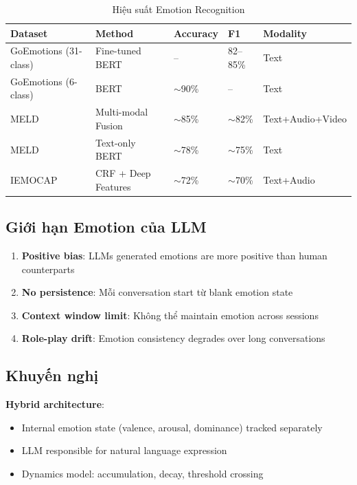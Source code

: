 \documentclass[10pt,leqno]{amsart}
\begin{document}
\begin{table}[H]
\centering
\caption{Hiệu suất Emotion Recognition}
\label{tab:emotion-bench}
\begin{tabular}{lllll}
\toprule
\textbf{Dataset} & \textbf{Method} & \textbf{Accuracy} & \textbf{F1} & \textbf{Modality} \\
\midrule
GoEmotions (31-class) & Fine-tuned BERT & -- & 82--85\% & Text \\
GoEmotions (6-class) & BERT & $\sim$90\% & -- & Text \\
MELD & Multi-modal Fusion & $\sim$85\% & $\sim$82\% & Text+Audio+Video \\
MELD & Text-only BERT & $\sim$78\% & $\sim$75\% & Text \\
IEMOCAP & CRF + Deep Features & $\sim$72\% & $\sim$70\% & Text+Audio \\
\bottomrule
\end{tabular}
\end{table}

\subsection{Giới hạn Emotion của LLM}

\begin{enumerate}
    \item \textbf{Positive bias}: LLMs generated emotions are more positive than human counterparts
    \item \textbf{No persistence}: Mỗi conversation start từ blank emotion state
    \item \textbf{Context window limit}: Không thể maintain emotion across sessions
    \item \textbf{Role-play drift}: Emotion consistency degrades over long conversations
\end{enumerate}

\subsection{Khuyến nghị}

\textbf{Hybrid architecture}:
\begin{itemize}
    \item Internal emotion state (valence, arousal, dominance) tracked separately
    \item LLM responsible for natural language expression
    \item Dynamics model: accumulation, decay, threshold crossing
\end{itemize}
\end{document}
